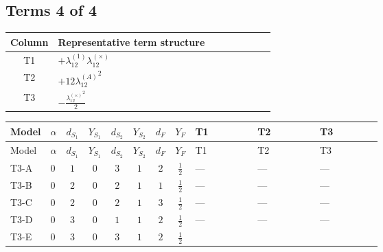 \documentclass[8pt]{article}
\begin{document}
\begin{landscape}
\subsection*{Terms 4 of 4}
\begin{center}
\begin{tabular}{@{}c >{\raggedright\arraybackslash}p{0.82\linewidth}@{}}
\toprule
Column & Representative term structure \\
\midrule
T1 & \(\displaystyle +{\lambda_{12}^{(1)}} {\lambda_{12}^{(\times)}}\) \\
\midrule
T2 & \(\displaystyle +12 {\lambda_{12}^{(A)}}^2\) \\
\midrule
T3 & \(\displaystyle -\frac{{\lambda_{12}^{(\times)}}^2}{2}\) \\
\midrule
\bottomrule
\end{tabular}
\end{center}
\smallskip
\tiny
\begin{longtable}{@{}llcccccc >{\raggedright\arraybackslash}p{0.21\linewidth} >{\raggedright\arraybackslash}p{0.21\linewidth} >{\raggedright\arraybackslash}p{0.21\linewidth}@{}}
\toprule
Model & $\alpha$ & $d_{S_1}$ & $Y_{S_1}$ & $d_{S_2}$ & $Y_{S_2}$ & $d_F$ & $Y_F$ & T1 & T2 & T3 \\
\midrule
\endfirsthead
\toprule
Model & $\alpha$ & $d_{S_1}$ & $Y_{S_1}$ & $d_{S_2}$ & $Y_{S_2}$ & $d_F$ & $Y_F$ & T1 & T2 & T3 \\
\midrule
\endhead
T3-A & $0$ & $1$ & $0$ & $3$ & $1$ & $2$ & $\frac{1}{2}$ & --- & --- & --- \\
\midrule
T3-B & $0$ & $2$ & $0$ & $2$ & $1$ & $1$ & $\frac{1}{2}$ & --- & --- & --- \\
\midrule
T3-C & $0$ & $2$ & $0$ & $2$ & $1$ & $3$ & $\frac{1}{2}$ & --- & --- & --- \\
\midrule
T3-D & $0$ & $3$ & $0$ & $1$ & $1$ & $2$ & $\frac{1}{2}$ & --- & --- & --- \\
\midrule
T3-E & $0$ & $3$ & $0$ & $3$ & $1$ & $2$ & $\frac{1}{2}$ & \scriptsize\adjustbox{max width=\linewidth}{$\begin{gathered} +{\lambda_{12}^{(1)}} {\lambda_{12}^{(\times)}}\end{gathered}$} & \scriptsize\adjustbox{max width=\linewidth}{$\begin{gathered} +12 {\lambda_{12}^{(A)}}^2\end{gathered}$} & \scriptsize\adjustbox{max width=\linewidth}{$\begin{gathered} -\frac{{\lambda_{12}^{(\times)}}^2}{2}\end{gathered}$} \\
\midrule
\bottomrule
\end{longtable}
\clearpage

\end{landscape}
\end{document}

